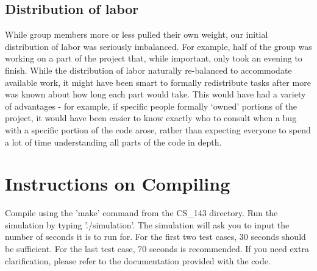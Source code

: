 \documentclass[12pt]{article}
\begin{document}
\subsection*{Distribution of labor}

While group members more or less pulled their own weight, our initial distribution of labor was seriously imbalanced. For example, half of the group was working on a part of the project that, while important, only took an evening to finish. While the distribution of labor naturally re-balanced to accommodate available work, it might have been smart to formally redistribute tasks after more was known about how long each part would take. This would have had a variety of advantages - for example, if specific people formally ‘owned’ portions of the project, it would have been easier to know exactly who to consult when a bug with a specific portion of the code arose, rather than expecting everyone to spend a lot of time understanding all parts of the code in depth.



\appendix
\section{Instructions on Compiling}

Compile using the 'make' command from the CS\_143 directory. Run the simulation by typing './simulation'. 
The simulation will ask you to input the number of seconds it is to run for. For the first two test cases, 30 seconds should be sufficient. For the last test case, 70 seconds is recommended.
If you need extra clarification, please refer to the documentation provided with the code.
\end{document}

